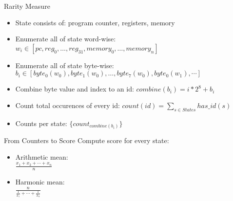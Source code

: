 \documentclass[10pt]{beamer}
\begin{document}
\begin{frame}{Rarity Measure}
	\begin{itemize}
    \item State consists of: program counter, registers, memory
    \item Enumerate all of state word-wise: $w_i \in [pc, reg_0, \ldots, reg_{31}, memory_0, \ldots, memory_n]$
    \item Enumerate all of state byte-wise: $b_i \in [ byte_0(w_0), byte_1(w_0), \ldots, byte_7(w_0), byte_0(w_1), \cdots ]$
    \item Combine byte value and index to an id: $combine(b_i) = i * 2^8 + b_i$
    \item Count total occurences of every id: $count(id) = \sum_{s \in States} has\_id(s)$
    \item Counts per state: $\{ count_{combine(b_i)} \}$
	\end{itemize}
\end{frame}

\begin{frame}{From Counters to Score}
  Compute score for every state:

  \begin{itemize}
    \item Arithmetic mean: \\
      $\frac{x_1 + x_2 + \cdots + x_n}{n}$
    \item Harmonic mean: \\
      $\frac{n}{\frac{1}{x_1} + \dotsb + \frac{1}{x_n}}$
  \end{itemize}
\end{frame}

\begin{frame}[allowframebreaks]
    \printbibliography
\end{frame}
\end{document}
